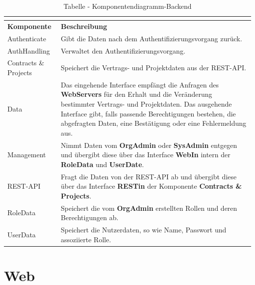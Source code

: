 \begin{longtable}[h]{|p{2.5cm}|p{10.0cm}|}
	\caption{Tabelle - Komponentendiagramm-Backend}
	\centering
	\label{tab:table_comp_backend}
	\endlastfoot
	\hline \multicolumn{2}{|r|}{{Weitergeführt auf der folgenden Seite}} \\ \hline
	\endfoot
	\endhead
	\hline
	\textbf{Komponente} & \textbf{Beschreibung} \\ 
	\hline
	Authenticate & Gibt die Daten nach dem Authentifizierungsvorgang zurück. \\
	\hline
	AuthHandling & Verwaltet den Authentifizierungsvorgang.  \\
	\hline
	Contracts {\&} Projects & Speichert die Vertrags- und Projektdaten aus der REST-API. \\
	\hline
	Data & Das eingehende Interface empfängt die Anfragen des \textbf{WebServers} für den Erhalt und die Veränderung bestimmter Vertrags- und Projektdaten. Das ausgehende Interface gibt, falls passende Berechtigungen bestehen, die abgefragten Daten, eine Bestätigung oder eine Fehlermeldung aus.  \\
	\hline
	Management & Nimmt Daten vom \textbf{OrgAdmin} oder \textbf{SysAdmin} entgegen und übergibt diese über das Interface \textbf{WebIn} intern der \textbf{RoleData} und \textbf{UserDate}. \\
	\hline
	REST-API & Fragt die Daten von der REST-API ab und übergibt diese über das Interface \textbf{RESTin} der Komponente \textbf{Contracts {\&} Projects}. \\
	\hline
	RoleData & Speichert die vom \textbf{OrgAdmin} erstellten Rollen und deren Berechtigungen ab. \\
	\hline
	UserData & Speichert die Nutzerdaten, so wie Name, Passwort und assoziierte Rolle. \\
	\hline
\end{longtable}

\clearpage

\section{Web}

